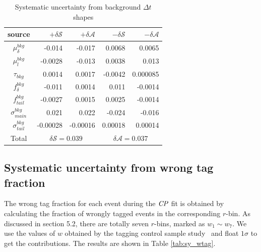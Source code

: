 \begin{table}[htpb]
\begin{minipage}[b]{1.0\linewidth}
\centering
\caption{Systematic uncertainty from background $\Delta t$ shapes}
\label{tab:sy_bkgt}
\begin{tabular}{c r r r r}
\hline
source & $+\delta \mathcal{S}$ & $+\delta \mathcal{A}$ & $-\delta \mathcal{S}$ &  $-\delta \mathcal{A}$\\
\hline
$\mu^{bkg}_{\delta}$ & -0.014
& -0.017
& 0.0068
& 0.0065
\\
$\mu^{bkg}_{l}$&  -0.0028
& -0.013
& 0.0038
& 0.013
\\
$\tau_{bkg}$ & 0.0014
& 0.0017
& -0.0042
& 0.000085\\
$f_{\delta}^{bkg}$ &  -0.011
& 0.0014
& 0.011
& -0.0014
\\
$f^{bkg}_{tail}$  &-0.0027
& 0.0015
& 0.0025
& -0.0014
\\
$\sigma^{bkg}_{main}$ & 0.021
& 0.022
& -0.024
& -0.016
\\
$\sigma^{bkg}_{tail}$ & -0.00028 & -0.00016
& 0.00018
& 0.00014
\\
\hline
Total &
\multicolumn{2}{c}{$\delta \mathcal{S}=0.039$} &
\multicolumn{2}{c}{$\delta \mathcal{A}=0.037$}\\
\hline
\end{tabular}
\end{minipage}
\end{table}



\subsection{Systematic uncertainty from wrong tag fraction}
The wrong tag fraction for each event during the $\it{CP}$ fit is obtained by calculating the fraction of wrongly tagged events in the corresponding $r$-bin. As discussed in section 5.2, there are totally seven $r$-bins, marked as $w_1 \sim w_7$. We use the values of $w$ obtained by the tagging control sample study~\cite{abudinen2020first} and float $1\sigma$ to get the contributions. The results are shown in Table \ref{tab:sy_wtag}.


